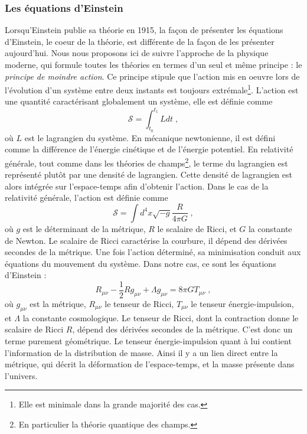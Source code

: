 \documentclass[11pt, twoside, a4paper, openright]{report}
\begin{document}
\subsubsection{Les équations d'Einstein}
Lorsqu'Einstein publie sa théorie en 1915, la façon de présenter les équations d'Einstein, le coeur de la théorie, est différente de la façon de les présenter aujourd'hui. Nous nous proposons ici de suivre l'approche de la physique moderne, qui formule toutes les théories en termes d'un seul et même principe : le \emph{principe de moindre action}. Ce principe stipule que l'action mis en oeuvre lors de l'évolution d'un système entre deux instants est toujours extrémale\footnote{Elle est minimale dans la grande majorité des cas.}. L'action est une quantité caractérisant globalement un système, elle est définie comme
\begin{equation}
  \label{eq:action}
  \mathcal{S} = \int_{t_0}^{t_1} L dt \; ,
\end{equation}
où $L$ est le lagrangien du système. En mécanique newtonienne, il est défini comme la différence de l'énergie cinétique et de l'énergie potentiel. En relativité générale, tout comme dans les théories de champs\footnote{En particulier la théorie quantique des champs.}, le terme du lagrangien est représenté plutôt par une densité de lagrangien. Cette densité de lagrangien est alors intégrée sur l'espace-temps afin d'obtenir l'action. Dans le cas de la relativité générale, l'action est définie comme
\begin{equation}
  \label{eq:actionrg}
  \mathcal{S} = \int d^4x \sqrt{-g} \frac{R}{4 \pi G}  \; ,
\end{equation}
où $g$ est le déterminant de la métrique, $R$ le scalaire de Ricci, et $G$ la constante de Newton. Le scalaire de Ricci caractérise la courbure, il dépend des dérivées secondes de la métrique. Une fois l'action déterminé, sa minimisation conduit aux équations du mouvement du système. Dans notre cas, ce sont les équations d'Einstein :
\begin{equation}
  \label{eq:einstein}
  R_{\mu \nu} - \frac{1}{2} R g_{\mu \nu} + \Lambda g_{\mu \nu} = 8 \pi G T_{\mu \nu} \; ,
\end{equation}
où $g_{\mu \nu}$ est la métrique, $R_{\mu \nu}$ le tenseur de Ricci, $T_{\mu \nu}$ le tenseur énergie-impulsion, et $\Lambda$ la constante cosmologique. Le tenseur de Ricci, dont la contraction donne le scalaire de Ricci $R$, dépend des dérivées secondes de la métrique. C'est donc un terme purement géométrique. Le tenseur énergie-impulsion quant à lui contient l'information de la distribution de masse. Ainsi il y a un lien direct entre la métrique, qui décrit la déformation de l'espace-temps, et la masse présente dans l'univers.
\end{document}

